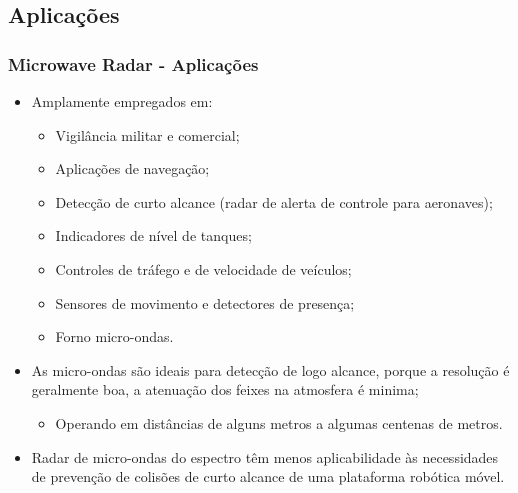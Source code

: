\documentclass[xcolor=dvipsnames, aspectratio=169]{beamer}
\begin{document}
    \subsection[Aplicações]{Aplicações} 
    \begin{frame}
    \frametitle{Microwave Radar - Aplicações}
        \begin{itemize}
            \item Amplamente empregados em:
            \begin{itemize}
                \item Vigilância militar e comercial;
                \item Aplicações de navegação;
                \item Detecção de curto alcance (radar de alerta de controle para aeronaves);
                \item Indicadores de nível de tanques;
                \item Controles de tráfego e de velocidade de veículos;
                \item Sensores de movimento e detectores de presença;
                \item Forno micro-ondas.
            \end{itemize}
            \item As micro-ondas são ideais para detecção de logo alcance, porque a resolução é geralmente boa, a atenuação dos feixes na atmosfera é minima;
            \begin{itemize}
                \item Operando em distâncias de alguns metros a algumas centenas de metros.
            \end{itemize}
            \item Radar de micro-ondas do espectro têm menos aplicabilidade às necessidades de prevenção de colisões de curto alcance de uma plataforma robótica móvel.
        \end{itemize}
    \end{frame}
\end{document}
